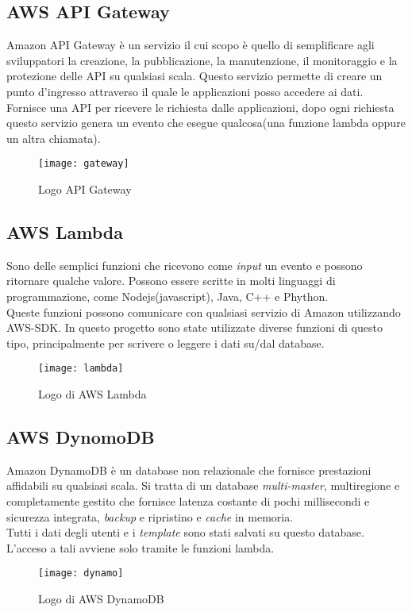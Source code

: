 \subsection{AWS API Gateway} Amazon API Gateway è un servizio il cui scopo è quello di semplificare agli sviluppatori
la creazione, la pubblicazione, la manutenzione, il monitoraggio e la protezione
delle \gls{API} su qualsiasi scala.
Questo servizio permette di creare un punto d'ingresso attraverso il quale le applicazioni posso accedere ai dati. Fornisce una API per ricevere le richiesta dalle applicazioni, dopo ogni richiesta questo servizio genera un evento che esegue qualcosa(una funzione lambda oppure un altra chiamata).
\begin{figure}[!h] 
	\centering 
	\texttt{[image: gateway]}
	\caption{Logo API Gateway}
\end{figure}

\subsection{AWS Lambda} 

Sono delle semplici funzioni che ricevono come \emph{input} un evento e possono ritornare qualche valore. Possono essere scritte in molti linguaggi di programmazione, come Nodejs(javascript), Java, C++ e Phython. 
\\

Queste funzioni possono comunicare con qualsiasi servizio di Amazon utilizzando AWS-\gls{SDK}. In questo progetto sono state utilizzate diverse funzioni di questo tipo, principalmente per scrivere o leggere i dati su/dal database.
\begin{figure}[!h] 
	\centering 
	\texttt{[image: lambda]}
	\caption{Logo di AWS Lambda}
\end{figure}  

\subsection{AWS DynomoDB} 
Amazon DynamoDB è un database non relazionale che fornisce prestazioni affidabili su qualsiasi scala. Si tratta di un database \emph{multi-master}, multiregione e completamente gestito che fornisce latenza costante di pochi millisecondi e sicurezza integrata, \emph{backup} e ripristino e \emph{cache} in memoria.
\\

 Tutti i dati degli utenti e i \emph{template} sono stati salvati su questo database. L'acceso a tali avviene solo tramite le funzioni lambda.   
\begin{figure}[!h] 
	\centering 
	\texttt{[image: dynamo]}
	\caption{Logo di AWS DynamoDB}
\end{figure}

